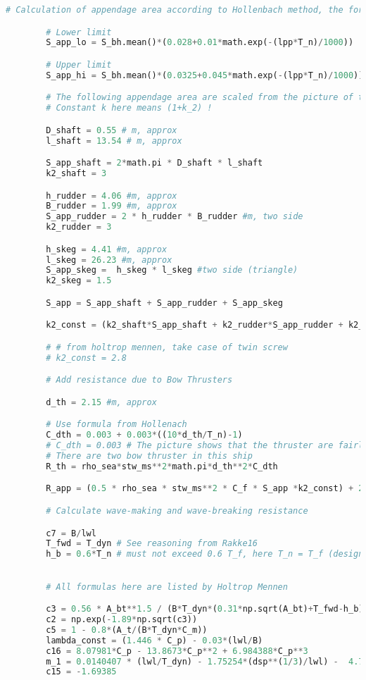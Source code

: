 \begin{lstlisting}[language=Python]
        # Calculation of appendage area according to Hollenbach method, the formula is for twin screw ship

        # Lower limit
        S_app_lo = S_bh.mean()*(0.028+0.01*math.exp(-(lpp*T_n)/1000))

        # Upper limit
        S_app_hi = S_bh.mean()*(0.0325+0.045*math.exp(-(lpp*T_n)/1000))

        # The following appendage area are scaled from the picture of the ship
        # Constant k here means (1+k_2) !

        D_shaft = 0.55 # m, approx
        l_shaft = 13.54 # m, approx

        S_app_shaft = 2*math.pi * D_shaft * l_shaft
        k2_shaft = 3   

        h_rudder = 4.06 #m, approx
        B_rudder = 1.99 #m, approx
        S_app_rudder = 2 * h_rudder * B_rudder #m, two side
        k2_rudder = 3

        h_skeg = 4.41 #m, approx
        l_skeg = 26.23 #m, approx
        S_app_skeg =  h_skeg * l_skeg #two side (triangle)
        k2_skeg = 1.5

        S_app = S_app_shaft + S_app_rudder + S_app_skeg

        k2_const = (k2_shaft*S_app_shaft + k2_rudder*S_app_rudder + k2_skeg*S_app_skeg)/S_app

        # # from holtrop mennen, take case of twin screw
        # k2_const = 2.8

        # Add resistance due to Bow Thrusters

        d_th = 2.15 #m, approx

        # Use formula from Hollenach
        C_dth = 0.003 + 0.003*((10*d_th/T_n)-1)
        # C_dth = 0.003 # The picture shows that the thruster are fairly parallel to midship area
        # There are two bow thruster in this ship
        R_th = rho_sea*stw_ms**2*math.pi*d_th**2*C_dth

        R_app = (0.5 * rho_sea * stw_ms**2 * C_f * S_app *k2_const) + 2*R_th

        # Calculate wave-making and wave-breaking resistance

        c7 = B/lwl
        T_fwd = T_dyn # See reasoning from Rakke16 
        h_b = 0.6*T_n # must not exceed 0.6 T_f, here T_n = T_f (design), reasong and coefficient value taken from Rakke
    

        # All formulas here are listed by Holtrop Mennen

        c3 = 0.56 * A_bt**1.5 / (B*T_dyn*(0.31*np.sqrt(A_bt)+T_fwd-h_b))
        c2 = np.exp(-1.89*np.sqrt(c3))
        c5 = 1 - 0.8*(A_t/(B*T_dyn*C_m))
        lambda_const = (1.446 * C_p) - 0.03*(lwl/B)
        c16 = 8.07981*C_p - 13.8673*C_p**2 + 6.984388*C_p**3
        m_1 = 0.0140407 * (lwl/T_dyn) - 1.75254*(dsp**(1/3)/lwl) -  4.79323*(B/lwl) - c16
        c15 = -1.69385


\end{lstlisting}
